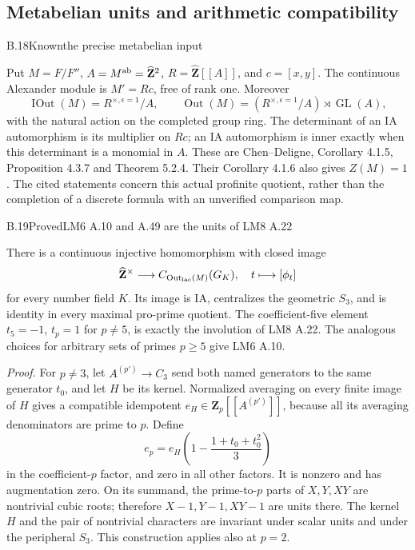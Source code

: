 \subsection{Metabelian units and arithmetic compatibility}


\begin{statement}{B.18}{Known}{the precise metabelian input}
\citep{LiftChenDeligne2017}
\end{statement}
Put $M=F/F''$, $A=M^{\rm ab}=\widehat{\mathbf Z}^2$,
$R=\widehat{\mathbf Z}[[A]]$, and $c=[x,y]$. The continuous
Alexander module is $M'=Rc$, free of rank one. Moreover
\[
 \operatorname{IOut}(M)=R^{\times,\epsilon=1}/A,
 \qquad
 \operatorname{Out}(M)=
 (R^{\times,\epsilon=1}/A)\rtimes\operatorname{GL}(A),
\]
with the natural action on the completed group ring. The
determinant of an IA automorphism is its multiplier on $Rc$;
an IA automorphism is inner exactly when this determinant is a
monomial in $A$. These are Chen--Deligne, Corollary 4.1.5,
Proposition 4.3.7 and Theorem 5.2.4. Their Corollary 4.1.6 also
gives $Z(M)=1$. The cited statements concern this actual
profinite quotient, rather than the completion of a discrete
formula with an unverified comparison map.

\begin{statement}{B.19}{Proved}{LM6 A.10 and A.49 are the units of LM8 A.22}
\end{statement}
There is a continuous injective homomorphism with closed image
\[
 \widehat{\mathbf Z}^{\times}\longrightarrow
 C_{\operatorname{Out}_{\rm lac}(M)}(G_K),\quad
 t\longmapsto[\phi_t]
\]
for every number field $K$. Its image is IA, centralizes the
geometric $S_3$, and is identity in every maximal pro-prime
quotient. The coefficient-five element $t_5=-1$, $t_p=1$ for
$p\ne5$, is exactly the involution of LM8 A.22. The analogous
choices for arbitrary sets of primes $p\ge5$ give LM6 A.10.

\emph{Proof.}
For $p\ne3$, let $A^{(p')}\to C_3$ send both named generators
to the same generator $t_0$, and let $H$ be its kernel.
Normalized averaging on every finite image of $H$ gives a
compatible idempotent $e_H\in\mathbf Z_p[[A^{(p')}]]$, because
all its averaging denominators are prime to $p$. Define
\[
 e_p=e_H\left(1-\frac{1+t_0+t_0^2}{3}\right)
\]
in the coefficient-$p$ factor, and zero in all other factors.
It is nonzero and has augmentation zero. On its summand,
the prime-to-$p$ parts of $X,Y,XY$ are nontrivial cubic roots;
therefore $X-1,Y-1,XY-1$ are units there. The kernel $H$ and
the pair of nontrivial characters are invariant under scalar
units and under the peripheral $S_3$. This construction applies
also at $p=2$.

